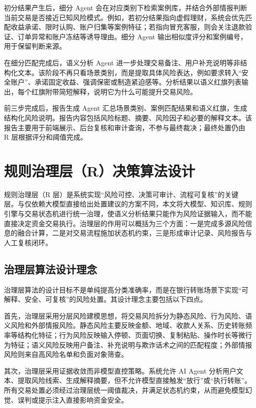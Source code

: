 \documentclass{xduugthesis}
\begin{document}
初分结果产生后，细分 Agent 会在对应类别下检索案例库，并结合外部情报判断当前交易是否接近已知风险模式。例如，若初分结果指向虚假理财，系统会优先匹配收益承诺、限时认购、账户归集等案例特征；若指向冒充客服，则会关注退款验证、订单异常和账户冻结等诱导理由。细分 Agent 输出相似度评分和案例编号，用于保留判断来源。

在细分匹配完成后，语义分析 Agent 进一步处理交易备注、用户补充说明等非结构化文本。该阶段不再只看场景类别，而是提取具体风险表达，例如要求转入“安全账户”、承诺固定收益、强调保密或制造紧迫感等。分析结果以语义红旗列表输出，每个红旗附带简短解释，说明它为什么可能提升交易风险。

前三步完成后，报告生成 Agent 汇总场景类别、案例匹配结果和语义红旗，生成结构化风险说明。报告内容包括风险标题、摘要、风险因子和必要的解释文本。该报告主要用于前端展示、后台复核和审计查询，不参与最终裁决；最终处置仍由 R 层根据评分和阈值完成。

\section{规则治理层（R）决策算法设计}

规则治理层（R 层）是系统实现“风险可控、决策可审计、流程可复核”的关键层。与仅依赖大模型直接给出处置建议的方案不同，本文将大模型、知识库、规则引擎与交易状态机进行统一治理，使语义分析结果只能作为风险证据输入，而不能直接决定资金交易执行。治理层的作用可以概括为三个方面：一是完成多源风险信息的融合计算，二是对交易流程施加状态机约束，三是形成审计记录、风险报告与人工复核闭环。

\subsection{治理层算法设计理念}

治理层算法的设计目标不是单纯提高分类准确率，而是在银行转账场景下实现“可解释、安全、可复核”的风险处置。其设计理念主要包括以下四点。

首先，治理层采用分层风险建模思想，将交易风险拆分为静态风险、行为风险、语义风险和外部情报风险。静态风险主要反映金额、地域、收款人关系、历史转账频率等结构化特征；行为风险反映输入停顿、页面切换、复制粘贴、操作时长等微行为特征；语义风险反映用户备注、补充说明与欺诈话术之间的匹配程度；外部情报风险则来自高风险名单和负面对象筛查。

其次，治理层采用证据收敛而非模型直控策略。系统允许 AI Agent 分析用户文本、提取风险线索、生成解释摘要，但不允许模型直接触发“放行”或“执行转账”。所有交易处置必须经过治理层统一阈值裁决，并满足状态机约束，从而避免模型幻觉、误判或提示注入直接影响资金安全。
\end{document}
